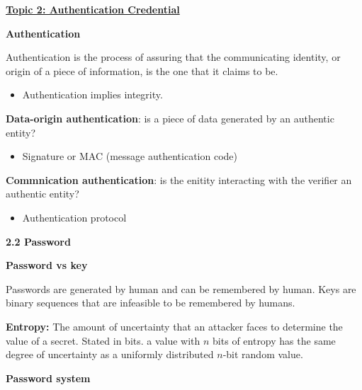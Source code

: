 \documentclass[landscape,a4paper]{extarticle}
\begin{document}
\begin{multicols*}{5}
    \textbf{\uline{Topic 2: Authentication Credential}}

    \textbf{Authentication}

    Authentication is the process of assuring that the communicating identity, or origin of a
    piece of information, is the one that it claims to be.

    \begin{itemize}
        \item Authentication implies integrity.
    \end{itemize}

    \textbf{Data-origin authentication}: is a piece of data generated by an authentic entity?
    \begin{itemize}
        \item Signature or MAC (message authentication code)
    \end{itemize}

    \textbf{Commnication authentication}: is the enitity interacting with the verifier an authentic entity?
    \begin{itemize}
        \item Authentication protocol
    \end{itemize}

    \textbf{2.2 Password}

    \textbf{Password vs key}

    Passwords are generated by human and can be remembered by human. Keys are binary sequences that are infeasible to be 
    remembered by humans.

    \textbf{Entropy:} The amount of uncertainty that an attacker faces to determine the value of a secret. 
    Stated in bits. a value with $n$ bits of entropy has the same degree of uncertainty as a uniformly distributed $n$-bit
    random value.

    \textbf{Password system}


\end{multicols*}
\end{document}
